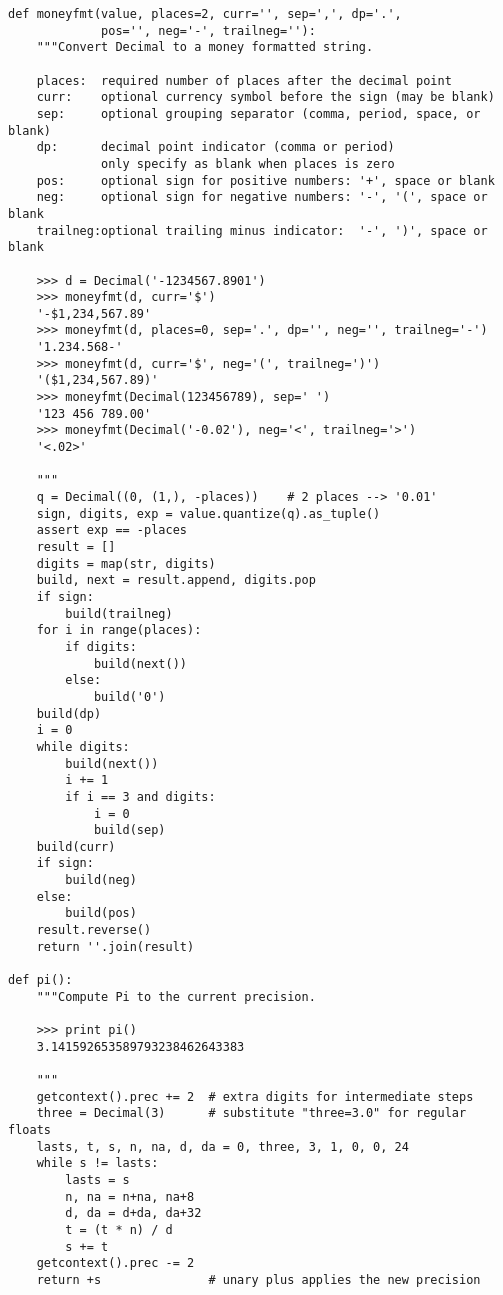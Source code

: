 \begin{verbatim}
def moneyfmt(value, places=2, curr='', sep=',', dp='.',
             pos='', neg='-', trailneg=''):
    """Convert Decimal to a money formatted string.

    places:  required number of places after the decimal point
    curr:    optional currency symbol before the sign (may be blank)
    sep:     optional grouping separator (comma, period, space, or blank)
    dp:      decimal point indicator (comma or period)
             only specify as blank when places is zero
    pos:     optional sign for positive numbers: '+', space or blank
    neg:     optional sign for negative numbers: '-', '(', space or blank
    trailneg:optional trailing minus indicator:  '-', ')', space or blank

    >>> d = Decimal('-1234567.8901')
    >>> moneyfmt(d, curr='$')
    '-$1,234,567.89'
    >>> moneyfmt(d, places=0, sep='.', dp='', neg='', trailneg='-')
    '1.234.568-'
    >>> moneyfmt(d, curr='$', neg='(', trailneg=')')
    '($1,234,567.89)'
    >>> moneyfmt(Decimal(123456789), sep=' ')
    '123 456 789.00'
    >>> moneyfmt(Decimal('-0.02'), neg='<', trailneg='>')
    '<.02>'

    """
    q = Decimal((0, (1,), -places))    # 2 places --> '0.01'
    sign, digits, exp = value.quantize(q).as_tuple()
    assert exp == -places    
    result = []
    digits = map(str, digits)
    build, next = result.append, digits.pop
    if sign:
        build(trailneg)
    for i in range(places):
        if digits:
            build(next())
        else:
            build('0')
    build(dp)
    i = 0
    while digits:
        build(next())
        i += 1
        if i == 3 and digits:
            i = 0
            build(sep)
    build(curr)
    if sign:
        build(neg)
    else:
        build(pos)
    result.reverse()
    return ''.join(result)

def pi():
    """Compute Pi to the current precision.

    >>> print pi()
    3.141592653589793238462643383
    
    """
    getcontext().prec += 2  # extra digits for intermediate steps
    three = Decimal(3)      # substitute "three=3.0" for regular floats
    lasts, t, s, n, na, d, da = 0, three, 3, 1, 0, 0, 24
    while s != lasts:
        lasts = s
        n, na = n+na, na+8
        d, da = d+da, da+32
        t = (t * n) / d
        s += t
    getcontext().prec -= 2
    return +s               # unary plus applies the new precision


\end{verbatim}
